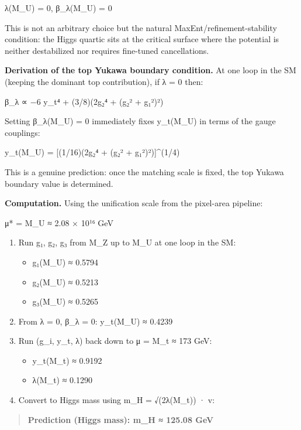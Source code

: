 \documentclass[
]{article}
\providecommand{\tightlist}{%
  \setlength{\itemsep}{0pt}\setlength{\parskip}{0pt}}
\begin{document}
λ(M\_U) = 0, β\_λ(M\_U) = 0

This is not an arbitrary choice but the natural
MaxEnt/refinement-stability condition: the Higgs quartic sits at the
critical surface where the potential is neither destabilized nor
requires fine-tuned cancellations.

\textbf{Derivation of the top Yukawa boundary condition.} At one loop in
the SM (keeping the dominant top contribution), if λ = 0 then:

β\_λ ∝ −6 y\_t⁴ + (3/8)(2g₂⁴ + (g₂² + g₁²)²)

Setting β\_λ(M\_U) = 0 immediately fixes y\_t(M\_U) in terms of the
gauge couplings:

y\_t(M\_U) = {[}(1/16)(2g₂⁴ + (g₂² + g₁²)²){]}\^{}(1/4)

This is a genuine prediction: once the matching scale is fixed, the top
Yukawa boundary value is determined.

\textbf{Computation.} Using the unification scale from the pixel-area
pipeline:

μ* = M\_U ≈ 2.08 × 10¹⁶ GeV

\begin{enumerate}
\def\labelenumi{\arabic{enumi}.}
\item
  Run g₁, g₂, g₃ from M\_Z up to M\_U at one loop in the SM:

  \begin{itemize}
  \tightlist
  \item
    g₁(M\_U) ≈ 0.5794
  \item
    g₂(M\_U) ≈ 0.5213
  \item
    g₃(M\_U) ≈ 0.5265
  \end{itemize}
\item
  From λ = 0, β\_λ = 0: y\_t(M\_U) ≈ 0.4239
\item
  Run (g\_i, y\_t, λ) back down to μ = M\_t ≈ 173 GeV:

  \begin{itemize}
  \tightlist
  \item
    y\_t(M\_t) ≈ 0.9192
  \item
    λ(M\_t) ≈ 0.1290
  \end{itemize}
\item
  Convert to Higgs mass using m\_H = √(2λ(M\_t)) · v:
\end{enumerate}

\begin{quote}
\textbf{Prediction (Higgs mass): m\_H ≈ 125.08 GeV}
\end{quote}
\end{document}
